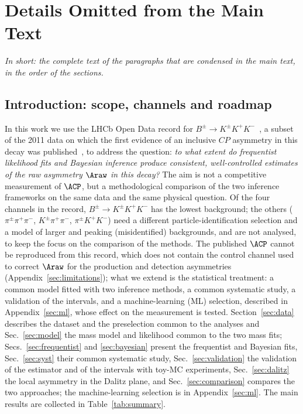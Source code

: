 \section{Details Omitted from the Main Text}
\label{app:details}
\emph{In short: the complete text of the paragraphs that are condensed in the main text, in the order of the sections.}

\subsection{Introduction: scope, channels and roadmap}
In this work we use the LHCb Open Data record for $B^{\pm}\to K^{\pm}K^{+}K^{-}$~\cite{opendata_record,opendata_notebook}, a subset of the 2011 data on which the first evidence of an inclusive $CP$ asymmetry in this decay was published~\cite{lhcb_cpv_2013}, to address the question: \emph{to what extent do frequentist likelihood fits and Bayesian inference produce consistent, well-controlled estimates of the raw asymmetry $\Araw$ in this decay?} The aim is not a competitive measurement of $\ACP$, but a methodological comparison of the two inference frameworks on the same data and the same physical question. Of the four channels in the record, $B^\pm\to K^\pm K^+K^-$ has the lowest background; the others ($\pi^\pm\pi^+\pi^-$, $K^\pm\pi^+\pi^-$, $\pi^\pm K^+K^-$) need a different particle-identification selection and a model of larger and peaking (misidentified) backgrounds, and are not analysed, to keep the focus on the comparison of the methods. The published $\ACP$ cannot be reproduced from this record, which does not contain the control channel used to correct $\Araw$ for the production and detection asymmetries (Appendix~\ref{sec:limitations}); what we extend is the statistical treatment: a common model fitted with two inference methods, a common systematic study, a validation of the intervals, and a machine-learning (ML) selection, described in Appendix~\ref{sec:ml}, whose effect on the measurement is tested. Section~\ref{sec:data} describes the dataset and the preselection common to the analyses and Sec.~\ref{sec:model} the mass model and likelihood common to the two mass fits; Secs.~\ref{sec:frequentist} and \ref{sec:bayesian} present the frequentist and Bayesian fits, Sec.~\ref{sec:syst} their common systematic study, Sec.~\ref{sec:validation} the validation of the estimator and of the intervals with toy-MC experiments, Sec.~\ref{sec:dalitz} the local asymmetry in the Dalitz plane, and Sec.~\ref{sec:comparison} compares the two approaches; the machine-learning selection is in Appendix~\ref{sec:ml}. The main results are collected in Table~\ref{tab:summary}.


